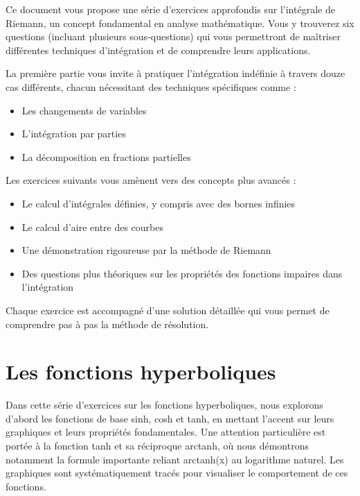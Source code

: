 \documentclass[
  12pt,
  letterpaper,
]{book}
\providecommand{\tightlist}{%
  \setlength{\itemsep}{0pt}\setlength{\parskip}{0pt}}\usepackage{longtable,booktabs,array}
\theoremstyle{remark}
\begin{document}

Ce document vous propose une série d'exercices approfondis sur
l'intégrale de Riemann, un concept fondamental en analyse mathématique.
Vous y trouverez six questions (incluant plusieurs sous-questions) qui
vous permettront de maîtriser différentes techniques d'intégration et de
comprendre leurs applications.

La première partie vous invite à pratiquer l'intégration indéfinie à
travers douze cas différents, chacun nécessitant des techniques
spécifiques comme :

\begin{itemize}
\tightlist
\item
  Les changements de variables
\item
  L'intégration par parties
\item
  La décomposition en fractions partielles
\end{itemize}

Les exercices suivants vous amènent vers des concepts plus avancés :

\begin{itemize}
\tightlist
\item
  Le calcul d'intégrales définies, y compris avec des bornes infinies
\item
  Le calcul d'aire entre des courbes
\item
  Une démonstration rigoureuse par la méthode de Riemann
\item
  Des questions plus théoriques sur les propriétés des fonctions
  impaires dans l'intégration
\end{itemize}

Chaque exercice est accompagné d'une solution détaillée qui vous permet
de comprendre pas à pas la méthode de résolution.

\hypertarget{les-fonctions-hyperboliques}{%
\section*{Les fonctions
hyperboliques}\label{les-fonctions-hyperboliques}}


Dans cette série d'exercices sur les fonctions hyperboliques, nous
explorons d'abord les fonctions de base sinh, cosh et tanh, en mettant
l'accent sur leurs graphiques et leurs propriétés fondamentales. Une
attention particulière est portée à la fonction tanh et sa réciproque
arctanh, où nous démontrons notamment la formule importante reliant
arctanh(x) au logarithme naturel. Les graphiques sont systématiquement
tracés pour visualiser le comportement de ces fonctions.
\end{document}
